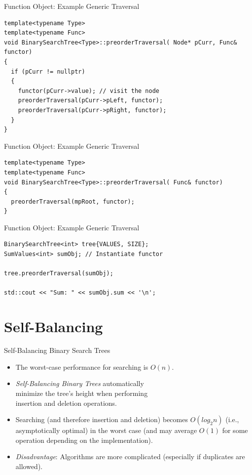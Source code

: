 \documentclass[14pt,aspectratio=1610]{beamer}
\begin{document}
\begin{frame}[fragile]{Function Object: Example Generic Traversal}
\begin{lstlisting}[basicstyle=\ttfamily\small]
template<typename Type>
template<typename Func>
void BinarySearchTree<Type>::preorderTraversal( Node* pCurr, Func& functor)
{
  if (pCurr != nullptr)
  {
    functor(pCurr->value); // visit the node
    preorderTraversal(pCurr->pLeft, functor);
    preorderTraversal(pCurr->pRight, functor);
  }
}
\end{lstlisting}
\end{frame}

\begin{frame}[fragile]{Function Object: Example Generic Traversal}
\begin{lstlisting}[basicstyle=\ttfamily\small]
template<typename Type>
template<typename Func>
void BinarySearchTree<Type>::preorderTraversal( Func& functor)
{
  preorderTraversal(mpRoot, functor);
}
\end{lstlisting}
\end{frame}

\begin{frame}[fragile]{Function Object: Example Generic Traversal}
\begin{lstlisting}[basicstyle=\ttfamily\small]
BinarySearchTree<int> tree{VALUES, SIZE};
SumValues<int> sumObj; // Instantiate functor

tree.preorderTraversal(sumObj);

std::cout << "Sum: " << sumObj.sum << '\n';
\end{lstlisting}
\end{frame}

\section{Self-Balancing}
\begin{frame}{Self-Balancing Binary Search Trees}
\begin{itemize}[<+->]
  \item
    The worst-case performance for searching is \(O(n)\).
  \item
    \emph{Self-Balancing Binary Trees} automatically \\
    minimize the tree's height when performing\\
    insertion and deletion operations.
  \item
    Searching (and therefore insertion and deletion) becomes $O(log_2{n})$ (i.e., asymptotically optimal) in the worst case (and may average $O(1)$ for some operation depending on the implementation).
  \item
    \emph{Disadvantage}: Algorithms are more complicated (especially if duplicates are allowed).
\end{itemize}
\end{frame}
\end{document}
